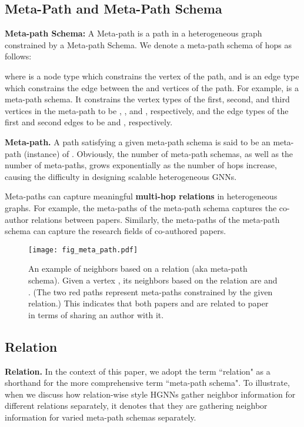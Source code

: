 \documentclass[lettersize,journal]{IEEEtran}
\begin{document}
\subsection{Meta-Path and Meta-Path Schema}\label{sec:meta_path} 

\textbf{Meta-path Schema:}
A Meta-path is a path in a heterogeneous graph constrained by a Meta-path Schema.
We denote a meta-path schema of  hops as follows:

where  is a node type which constrains the  vertex of the path, and  is an edge type which constrains the edge between the  and  vertices of the path.
For example,  is a meta-path schema.
It constrains the vertex types of the first, second, and third vertices in the meta-path to be , , and , respectively, and the edge types of the first and second edges to be  and , respectively.  


\textbf{Meta-path.}
A path satisfying a given meta-path schema  is said to be an meta-path (instance) of .
Obviously, the number of meta-path schemas, as well as the number of meta-paths, grows exponentially as the number of hops  increase, causing the difficulty in designing scalable heterogeneous GNNs.


Meta-paths can capture meaningful \textbf{multi-hop relations} in heterogeneous graphs.
For example, the meta-paths of the meta-path schema  captures the co-author relations between papers.
Similarly, the meta-paths of the meta-path schema  can capture the research fields of co-authored papers.




\begin{figure}[!tp]
\centering\texttt{[image: fig\_meta\_path.pdf]}
\vspace{-3mm}
\caption{
An example of neighbors based on a relation (aka meta-path schema).
Given a  vertex , its neighbors based on the relation  are  and .
(The two red paths represent meta-paths constrained by the given relation.)
This indicates that both papers  and  are related to paper  in terms of sharing an author with it.
}
 \label{fig:meta_path}
 \vspace{-4mm}
\end{figure}



\subsection{Relation}


\textbf{Relation.}
In the context of this paper, we adopt the term ``relation" as a shorthand for the more comprehensive term ``meta-path schema". 
To illustrate, when we discuss how relation-wise style HGNNs gather neighbor information for different relations separately, it denotes that they are gathering neighbor information for varied meta-path schemas separately.
\end{document}
